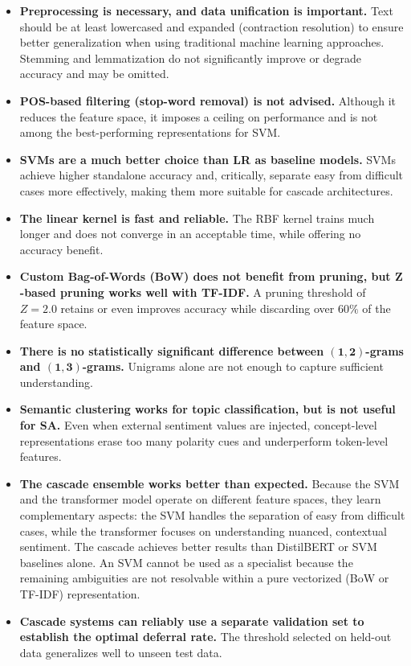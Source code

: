 \documentclass[a4paper,fleqn]{cas-dc}
\newcommand{\zscore}{Z}
\newcommand{\logreg}{LR}
\begin{document}
\begin{itemize}
	\item \textbf{Preprocessing is necessary, and data unification is important.} Text should be at least lowercased and expanded (contraction resolution) to ensure better generalization when using traditional machine learning approaches. Stemming and lemmatization do not significantly improve or degrade accuracy and may be omitted.
	
	\item \textbf{POS-based filtering (stop-word removal) is not advised.} Although it reduces the feature space, it imposes a ceiling on performance and is not among the best-performing representations for SVM.
	
	\item \textbf{SVMs are a much better choice than \logreg{} as baseline models.} SVMs achieve higher standalone accuracy and, critically, separate easy from difficult cases more effectively, making them more suitable for cascade architectures. 
	\item \textbf{The linear kernel is fast and reliable.} The RBF kernel trains much longer and does not converge in an acceptable time, while offering no accuracy benefit.
	
	\item \textbf{Custom Bag-of-Words (BoW) does not benefit from pruning, but $\mathbf{\zscore}$-based pruning works well with TF-IDF.} A pruning threshold of $\zscore = 2.0$ retains or even improves accuracy while discarding over $60\%$ of the feature space.
	
	\item \textbf{There is no statistically significant difference between $\mathbf{(1,2)}$-grams and $\mathbf{(1,3)}$-grams.} Unigrams alone are not enough to capture sufficient understanding.
	
	
	\item \textbf{Semantic clustering works for topic classification, but is not useful for SA.} Even when external sentiment values are injected, concept-level representations erase too many polarity cues and underperform token-level features.
	
	\item \textbf{The cascade ensemble works better than expected.} Because the SVM and the transformer model operate on different feature spaces, they learn complementary aspects: the SVM handles the separation of easy from difficult cases, while the transformer focuses on understanding nuanced, contextual sentiment. The cascade achieves better results than DistilBERT or SVM baselines alone. An SVM cannot be used as a specialist because the remaining ambiguities are not resolvable within a pure vectorized (BoW or TF-IDF) representation.
	
	\item \textbf{Cascade systems can reliably use a separate validation set to establish the optimal deferral rate.} The threshold selected on held-out data generalizes well to unseen test data.
\end{itemize}
\end{document}
